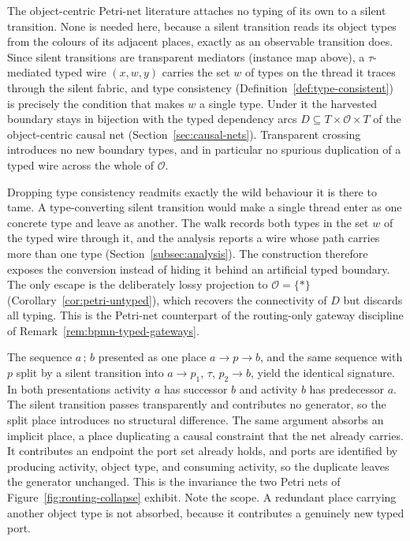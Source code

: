 \begin{remark}\label{rem:ocpn-silent-typing}
  The object-centric Petri-net literature attaches no typing of its own to a
  silent transition. None is needed here, because a silent transition reads its
  object types from the colours of its adjacent places,
  exactly as an observable transition does. Since silent transitions are
  transparent mediators (instance map above), a $\tau$-mediated typed wire
  $(x,w,y)$ carries the set $w$ of types on the thread it traces through
  the silent fabric, and type consistency (Definition~\ref{def:type-consistent})
  is precisely the condition that makes $w$ a single type. Under it the
  harvested boundary stays in bijection with the typed dependency arcs
  $D\subseteq T\times\mathcal{O}\times T$ of the object-centric causal net
  (Section~\ref{sec:causal-nets}). Transparent crossing introduces no new boundary
  types, and in particular no spurious duplication of a typed wire across the whole of
  $\mathcal{O}$.

  Dropping type consistency readmits exactly the wild behaviour it is there to
  tame. A type-converting silent transition would make a single thread enter as
  one concrete type and leave as another. The walk records both types in the set $w$
  of the typed wire through it, and the analysis reports a wire whose path carries more than one
  type (Section~\ref{subsec:analysis}). The construction therefore exposes the conversion
  instead of hiding it behind an artificial typed boundary. The
  only escape is the deliberately lossy projection to $\mathcal{O}=\{\ast\}$
  (Corollary~\ref{cor:petri-untyped}), which recovers the connectivity of $D$ but
  discards all typing. This is the Petri-net counterpart of the routing-only
  gateway discipline of Remark~\ref{rem:bpmn-typed-gateways}.
\end{remark}

\begin{remark}\label{rem:ab-place-vs-tau}
The sequence $a\,;\,b$ presented as one place $a\to p\to b$, and the same sequence with $p$ split by a silent transition into $a\to p_1$, $\tau$, $p_2\to b$, yield the identical signature. In both presentations activity $a$ has successor $b$ and activity $b$ has predecessor $a$. The silent transition passes transparently and contributes no generator, so the split place introduces no structural difference. The same argument absorbs an implicit place, a place duplicating a causal constraint that the net already carries. It contributes an endpoint the port set already holds, and ports are identified by producing activity, object type, and consuming activity, so the duplicate leaves the generator unchanged. This is the invariance the two Petri nets of Figure~\ref{fig:routing-collapse} exhibit. Note the scope. A redundant place carrying another object type is not absorbed, because it contributes a genuinely new typed port.
\end{remark}

